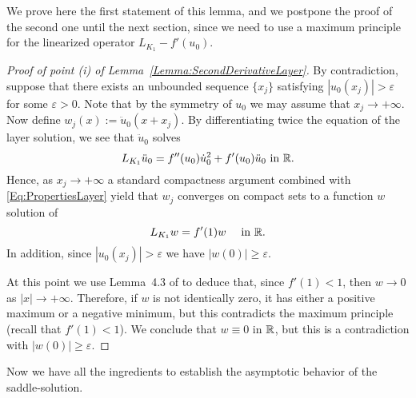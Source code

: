 We prove here the first statement of this lemma, and we postpone the proof of the second one until the next section, since we need to use a maximum principle for the linearized operator $L_{K_1} - f'(u_0)$.

\begin{proof}[Proof of point (i) of Lemma~\ref{Lemma:SecondDerivativeLayer}]
	By contradiction, suppose that there exists an unbounded sequence $\{x_j\}$ satisfying $|u_0(x_j)|>\varepsilon$ for some $\varepsilon>0$. Note that by the symmetry of $u_0$ we may assume that $x_j\to + \infty$. Now define $w_j (x) := \ddot{u}_0(x+x_j)$. By differentiating twice the equation of the layer solution, we see that $\ddot{u}_0$ solves
	$$
	L_{K_1} \ddot{u}_0 = f''(u_0)\dot{u}_0^2 + f'(u_0)\ddot{u}_0 \text{ in }\mathbb{R}.
	$$
	Hence, as $x_j \to +\infty$ a standard compactness argument combined with \eqref{Eq:PropertiesLayer} yield that $w_j$ converges on compact sets to a function $w$ solution of
	$$
	L_{K_1}  w = f'(1)w \quad \text{ in }\mathbb{R}.
	$$
	In addition, since $|u_0(x_j)|>\varepsilon$ we have $|w(0)|\geq \varepsilon$.
	
	At this point we use Lemma~4.3 of \cite{CozziPassalacqua} to deduce that, since $f'(1)<1$, then $w\to 0$ as $|x| \to +\infty$. Therefore, if $w$ is not identically zero, it has either a positive maximum or a negative minimum, but this contradicts the maximum principle (recall that $f'(1)<1$). We conclude that $w\equiv0$ in $\mathbb{R}$, but this is a contradiction with $|w(0)|\geq \varepsilon$.
\end{proof}




Now we have all the ingredients to establish the asymptotic behavior of the saddle-solution.



